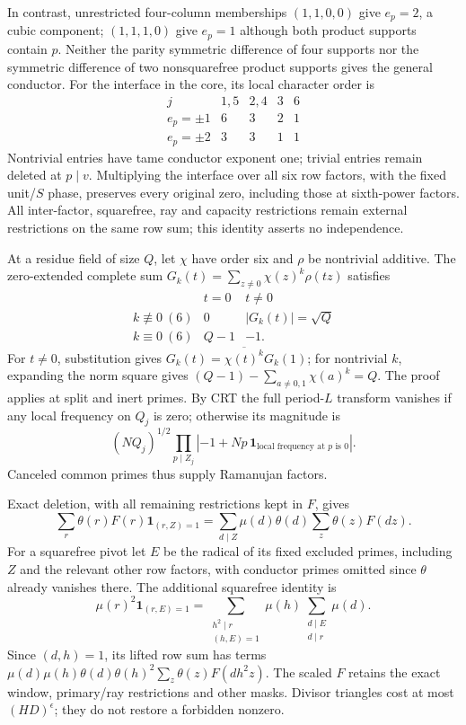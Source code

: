 \documentclass[11pt]{article}
\theoremstyle{definition}\newtheorem{definition}[theorem]{Definition}
\theoremstyle{remark}\newtheorem{remark}[theorem]{Remark}
\begin{document}
In contrast, unrestricted four-column memberships $(1,1,0,0)$ give
$e_p=2$, a cubic component; $(1,1,1,0)$ give $e_p=1$ although both
product supports contain $p$. Neither the parity symmetric difference
of four supports nor the symmetric difference of two nonsquarefree
product supports gives the general conductor.
For the interface in the core, its local character order is
\[
 \begin{array}{c|cccc}
 j&1,5&2,4&3&6\\ \hline
 e_p=\pm1&6&3&2&1\\
 e_p=\pm2&3&3&1&1
 \end{array}
\]
Nontrivial entries have tame conductor exponent one; trivial entries
remain deleted at $p\mid v$. Multiplying the interface over all six
row factors, with the fixed unit/$S$ phase, preserves every original
zero, including those at sixth-power factors. All inter-factor,
squarefree, ray and capacity restrictions remain external restrictions
on the same row sum; this identity asserts no independence.

At a residue field of size $Q$, let $\chi$ have order six and $\rho$
be nontrivial additive. The zero-extended complete sum
$G_k(t)=\sum_{z\ne0}\chi(z)^k\rho(tz)$ satisfies
\[
 \begin{array}{c|cc}
 &t=0&t\ne0\\ \hline
 k\not\equiv0\ (6)&0&|G_k(t)|=\sqrt Q\\
 k\equiv0\ (6)&Q-1&-1.
 \end{array}
\]
For $t\ne0$, substitution gives
$G_k(t)=\overline{\chi(t)^k}G_k(1)$; for nontrivial $k$,
expanding the norm square gives
$(Q-1)-\sum_{a\ne0,1}\chi(a)^k=Q$.
The proof applies at split and inert primes. By CRT the full period-$L$
transform vanishes if any local frequency on $Q_j$ is zero; otherwise
its magnitude is
\[
 (NQ_j)^{1/2}
 \prod_{p\mid Z_j}
 \left|-1+Np\,\mathbf1_{\text{local frequency at }p\text{ is }0}\right|.
\]
Canceled common primes thus supply Ramanujan factors.

Exact deletion, with all remaining restrictions kept in $F$, gives
\[
 \sum_r\theta(r)F(r)\mathbf1_{(r,Z)=1}
 =\sum_{d\mid Z}\mu(d)\theta(d)\sum_z\theta(z)F(dz).
\]
For a squarefree pivot let $E$ be the radical of its fixed excluded
primes, including $Z$ and the relevant other row factors, with
conductor primes omitted since $\theta$ already vanishes there.
The additional squarefree identity is
\[
 \mu(r)^2\mathbf1_{(r,E)=1}
 =\sum_{\substack{h^2\mid r\\(h,E)=1}}\mu(h)
       \sum_{\substack{d\mid E\\d\mid r}}\mu(d).
\]
Since $(d,h)=1$, its lifted row sum has terms
$\mu(d)\mu(h)\theta(d)\theta(h)^2\sum_z\theta(z)F(dh^2z)$.
The scaled $F$ retains the exact window, primary/ray restrictions and
other masks. Divisor triangles cost at most $(HD)^\epsilon$;
they do not restore a forbidden nonzero.
\end{document}
